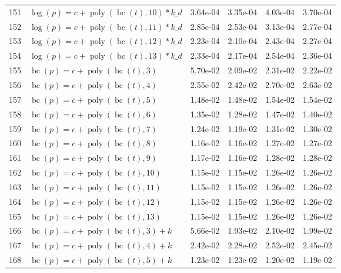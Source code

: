 \documentclass[12pt,a4paper]{article}
\DeclareMathOperator{\bc}{bc}
\DeclareMathOperator{\poly}{poly}
\begin{document}
\begin{longtable}[t]{ll>{\raggedleft\arraybackslash}p{2cm}>{\raggedleft\arraybackslash}p{2cm}>{\raggedleft\arraybackslash}p{2cm}>{\raggedleft\arraybackslash}p{2cm}}
\rowcolor{gray!6}  151 & $\log(p) = c + \poly\left( \bc(t), 10 \right) * k\_d$ & 3.64e-04 & 3.35e-04 & 4.03e-04 & 3.70e-04\\
152 & $\log(p) = c + \poly\left( \bc(t), 11 \right) * k\_d$ & 2.85e-04 & 2.53e-04 & 3.13e-04 & 2.77e-04\\
\rowcolor{gray!6}  153 & $\log(p) = c + \poly\left( \bc(t), 12 \right) * k\_d$ & 2.23e-04 & 2.10e-04 & 2.43e-04 & 2.27e-04\\
154 & $\log(p) = c + \poly\left( \bc(t), 13 \right) * k\_d$ & 2.33e-04 & 2.17e-04 & 2.54e-04 & 2.36e-04\\
\rowcolor{gray!6}  155 & $\bc(p) = c + \poly\left( \bc(t), 3 \right)$ & 5.70e-02 & 2.09e-02 & 2.31e-02 & 2.22e-02\\
156 & $\bc(p) = c + \poly\left( \bc(t), 4 \right)$ & 2.55e-02 & 2.42e-02 & 2.70e-02 & 2.63e-02\\
\rowcolor{gray!6}  157 & $\bc(p) = c + \poly\left( \bc(t), 5 \right)$ & 1.48e-02 & 1.48e-02 & 1.54e-02 & 1.54e-02\\
158 & $\bc(p) = c + \poly\left( \bc(t), 6 \right)$ & 1.35e-02 & 1.28e-02 & 1.47e-02 & 1.40e-02\\
\rowcolor{gray!6}  159 & $\bc(p) = c + \poly\left( \bc(t), 7 \right)$ & 1.24e-02 & 1.19e-02 & 1.31e-02 & 1.30e-02\\
160 & $\bc(p) = c + \poly\left( \bc(t), 8 \right)$ & 1.16e-02 & 1.16e-02 & 1.27e-02 & 1.27e-02\\
\rowcolor{gray!6}  161 & $\bc(p) = c + \poly\left( \bc(t), 9 \right)$ & 1.17e-02 & 1.16e-02 & 1.28e-02 & 1.28e-02\\
162 & $\bc(p) = c + \poly\left( \bc(t), 10 \right)$ & 1.15e-02 & 1.15e-02 & 1.26e-02 & 1.26e-02\\
\rowcolor{gray!6}  163 & $\bc(p) = c + \poly\left( \bc(t), 11 \right)$ & 1.15e-02 & 1.15e-02 & 1.26e-02 & 1.26e-02\\
164 & $\bc(p) = c + \poly\left( \bc(t), 12 \right)$ & 1.15e-02 & 1.15e-02 & 1.26e-02 & 1.26e-02\\
\rowcolor{gray!6}  165 & $\bc(p) = c + \poly\left( \bc(t), 13 \right)$ & 1.15e-02 & 1.15e-02 & 1.26e-02 & 1.26e-02\\
166 & $\bc(p) = c + \poly\left( \bc(t), 3 \right) + k$ & 5.66e-02 & 1.93e-02 & 2.10e-02 & 1.99e-02\\
\rowcolor{gray!6}  167 & $\bc(p) = c + \poly\left( \bc(t), 4 \right) + k$ & 2.42e-02 & 2.28e-02 & 2.52e-02 & 2.45e-02\\
168 & $\bc(p) = c + \poly\left( \bc(t), 5 \right) + k$ & 1.23e-02 & 1.23e-02 & 1.20e-02 & 1.19e-02\\

\end{longtable}
\end{document}

